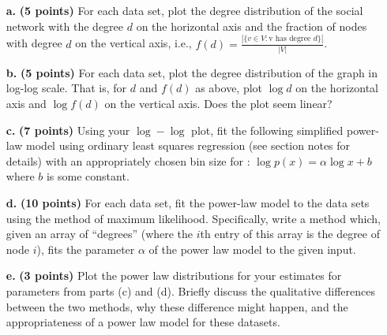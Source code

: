 \documentclass[11pt]{article} %
\begin{document}
\begin{itemize}
\item[\textbf{a.}] \textbf{(5 points)} For each data set, plot the degree distribution of the social network with
the degree $d$ on the horizontal axis and the fraction of nodes with degree $d$ on the vertical axis, i.e., $f(d) = \frac{|\{v \in V : \text{v has degree } d\}|}{|V|}$.
\item[\textbf{b.}] \textbf{(5 points)} For each data set, plot the degree distribution of the graph in log-log scale. That is, for $d$ and
$f(d)$ as above, plot $\log d$ on the horizontal axis and $\log f(d)$ on the vertical axis. Does the plot seem linear?
\item[\textbf{c.}] \textbf{(7 points)} Using your $\log - \log$ plot, fit the following simplified power-law model using ordinary least squares regression (see section notes for details) with an appropriately chosen bin size for : $\log p(x) = \alpha \log x + b$ where $b$ is some constant.
\item[\textbf{d.}] \textbf{(10 points)} For each data set, fit the power-law model to the data sets using the method of maximum likelihood. Specifically, write a method which,
given an array of “degrees” (where the $i$th entry of this array is the degree of node $i$), fits the parameter $\alpha$ of the
power law model to the given input. 
\item[\textbf{e.}] \textbf{(3 points)} Plot the power law distributions for your estimates for parameters from parts (c) and (d). Briefly discuss the qualitative differences between the two methods, why these difference might happen, and the appropriateness of a power law model for these datasets.
\end{itemize}
\end{document}
